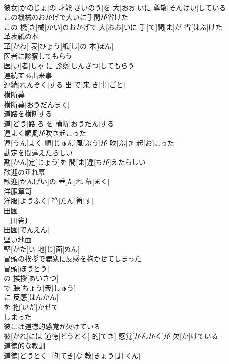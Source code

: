 \documentclass[8pt]{extreport}
\begin{document}
\begin{CJK}{UTF8}{min}
\\	彼女[かのじょ]の 才能[さいのう]を 大[おお]いに 尊敬[そんけい]している
\\	この機械のおかげで大いに手間が省けた	
\\	この 機[き]械[かい]のおかげで 大[おお]いに 手[て]間[ま]が 省[はぶ]けた
\\	革表紙の本	
\\	革[かわ] 表[ひょう]紙[し]の 本[ほん]
\\	医者に診察してもらう	
\\	医[い]者[しゃ]に 診察[しんさつ]してもらう
\\	連続する出来事	
\\	連続[れんぞく]する 出[で]来[き]事[ごと]
\\	横断幕	
\\	横断幕[おうだんまく]
\\	道路を横断する	
\\	道[どう]路[ろ]を 横断[おうだん]する
\\	運よく順風が吹き起こった	
\\	運[うん]よく 順[じゅん]風[ぷう]が 吹[ふ]き 起[お]こった
\\	勘定を間違えたらしい	
\\	勘[かん]定[じょう]を 間[ま]違[ちが]えたらしい
\\	歓迎の垂れ幕	
\\	歓迎[かんげい]の 垂[た]れ 幕[まく]
\\	洋服箪笥	
\\	洋服[ようふく] 箪[たん]笥[す]
\\	田園	
\\	〔田舎〕
\\	田園[でんえん]
\\	堅い地面	
\\	堅[かた]い 地[じ]面[めん]
\\	冒頭の挨拶で聴衆に反感を抱かせてしまった	
\\	冒頭[ぼうとう]
\\	の 挨拶[あいさつ]
\\	で 聴[ちょう]衆[しゅう]
\\	に 反感[はんかん]
\\	を 抱[いだ]かせて 
\\	しまった 
\\	彼には道徳的感覚が欠けている	
\\	彼[かれ]には 道徳[どうとく] 的[てき] 感覚[かんかく]が 欠[か]けている
\\	道徳的な教訓	
\\	道徳[どうとく] 的[てき]な 教[きょう]訓[くん]

\end{CJK}
\end{document}
